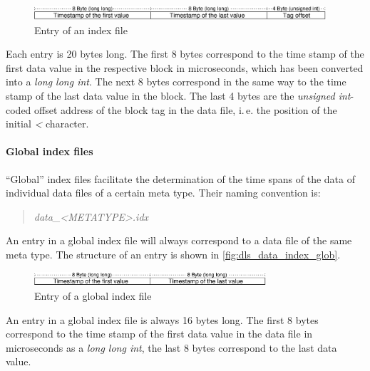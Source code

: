 \documentclass[a4paper,12pt,BCOR6mm,bibtotoc,idxtotoc]{scrbook}
\begin{document}
\begin{figure}[htb] \begin{center} \includegraphics[height=15pt]{bilder/dls_data_index_en} \end{center} \caption{Entry of an index file} \label{fig:dls_data_index} \end{figure}

Each entry is 20 bytes long. The first 8 bytes correspond to the time stamp of
the first data value in the respective block in microseconds, which has been
converted into a \textit{long long int}. The next 8 bytes correspond in the
same way to the time stamp of the last data value in the block. The last 4
bytes are the \textit{unsigned int}-coded offset address of the block tag in
the data file, i.\,e. the position of the initial \textit{\textless}
character.

\paragraph{Global index files} ``Global'' index files facilitate the
determination of the time spans of the data of individual data files of a
certain meta type. Their naming convention is:

\begin{quote} \textit{data\_\textless METATYPE\textgreater.idx} \end{quote}

An entry in a global index file will always correspond to a data file of the
same meta type. The structure of an entry is shown in
\autoref{fig:dls_data_index_glob}.

\begin{figure}[htb] \begin{center} \includegraphics[height=15pt]{bilder/dls_data_index_glob_en} \end{center} \caption{Entry of a global index file} \label{fig:dls_data_index_glob} \end{figure}

An entry in a global index file is always 16 bytes long. The first 8 bytes correspond to the time stamp of the first data value in the data file in microseconds as a \textit{long long int}, the last 8 bytes correspond to the last data value.
\end{document}
